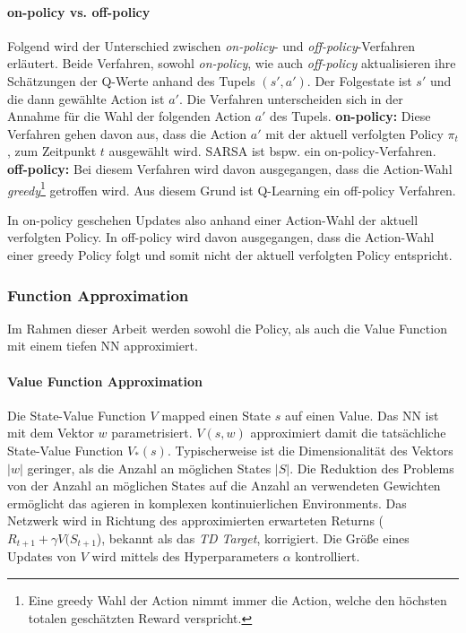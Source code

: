 \paragraph{on-policy vs. off-policy}\label{onVSoff-Policy}
Folgend wird der Unterschied zwischen \emph{on-policy}- und \emph{off-policy}-Verfahren erläutert. Beide Verfahren, sowohl \emph{on-policy}, wie auch \emph{off-policy} aktualisieren ihre Schätzungen der Q-Werte anhand des Tupels $(s',a')$. Der Folgestate ist $s'$ und die dann gewählte Action ist $a'$. Die Verfahren unterscheiden sich in der Annahme für die Wahl der folgenden Action $a'$ des Tupels. \newline
\textbf{on-policy:} Diese Verfahren gehen davon aus, dass die Action $a'$ mit der aktuell verfolgten Policy $\pi_t$, zum Zeitpunkt $t$ ausgewählt wird. SARSA ist bspw. ein on-policy-Verfahren.\newline
\textbf{off-policy:} Bei diesem Verfahren wird davon ausgegangen, dass die Action-Wahl \emph{greedy}\footnote{Eine greedy Wahl der Action nimmt immer die Action, welche den höchsten totalen geschätzten Reward verspricht.} getroffen wird. Aus diesem Grund ist Q-Learning ein off-policy Verfahren.

In on-policy geschehen Updates also anhand einer Action-Wahl der aktuell verfolgten Policy. In off-policy wird davon ausgegangen, dass die Action-Wahl einer greedy Policy folgt und somit nicht der aktuell verfolgten Policy entspricht.


\subsubsection{Function Approximation}\label{subsub:absch_RL_deepL_funcAppr}
Im Rahmen dieser Arbeit werden sowohl die Policy, als auch die Value Function mit einem tiefen NN approximiert. 

\paragraph{Value Function Approximation} 
Die State-Value Function $V$ mapped einen State $s$ auf einen Value. Das NN ist mit dem Vektor $w$ parametrisiert. $V(s,w)$ approximiert damit die tatsächliche State-Value Function $V_{*}(s)$. Typischerweise ist die Dimensionalität des Vektors $|w|$ geringer, als die Anzahl an möglichen States $|S|$. Die Reduktion des Problems von der Anzahl an möglichen States auf die Anzahl an verwendeten Gewichten ermöglicht das agieren in komplexen kontinuierlichen Environments. Das Netzwerk wird in Richtung des approximierten erwarteten Returns ($R_{t+1} + \gamma V(S_{t+1}$), bekannt als das \emph{TD Target}, korrigiert. Die Größe eines Updates von $V$ wird mittels des Hyperparameters $\alpha$ kontrolliert. 

